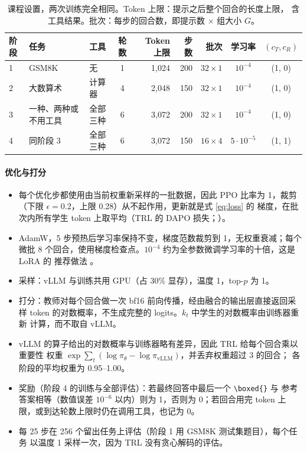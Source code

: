 \documentclass[11pt,a4paper,fontset=none]{ctexart}
\newcommand{\pis}{\pi_\theta}
\begin{document}
\begin{table}[t]
\centering\small
\caption{课程设置，两次训练完全相同。Token 上限：提示之后整个回合的长度上限，
含工具结果。批次：每步的回合数，即提示数 $\times$ 组大小 $G$。}
\label{tab:stages}
\begin{tabular}{@{}lllcrrrcc@{}}
\toprule
\headrow 阶段 & 任务 & 工具 & 轮数 & Token 上限 & 步数 & 批次 & 学习率
  & $(c_T, c_R)$ \\
\midrule
1 & GSM8K & 无 & 1 & 1{,}024 & 200 & $32\times1$ & $10^{-4}$ & (1, 0) \\
2 & 大数算术 & 计算器 & 4 & 2{,}048 & 150 & $32\times1$
  & $10^{-4}$ & (1, 0) \\
3 & 一种、两种或不用工具 & 全部三种 & 6 & 3{,}072 & 200 & $32\times1$
  & $10^{-4}$ & (1, 0) \\
4 & 同阶段 3 & 全部三种 & 6 & 3{,}072 & 150 & $16\times4$
  & $5\cdot10^{-5}$ & (1, 1) \\
\bottomrule
\end{tabular}
\end{table}

\paragraph{优化与打分}
\begin{itemize}[leftmargin=*,itemsep=1pt,topsep=2pt]
\item 每个优化步都使用由当前权重新采样的一批数据，因此 PPO 比率为 1，裁剪
  （下限 $\epsilon=0.2$，上限 0.28）从不起作用，更新就是式 \eqref{eq:loss} 的
  梯度，在批次内所有学生 token 上取平均（TRL 的 DAPO 损失；\citealp{yu2025dapo}）。
\item AdamW，5 步预热后学习率保持不变，梯度范数裁剪到 1，无权重衰减；每个微批
  8 个回合，使用梯度检查点。$10^{-4}$ 约为全参数微调学习率的十倍，这是 LoRA 的
  推荐做法 \citep{schulman2025lora}。
\item 采样：vLLM 与训练共用 GPU（占 30\% 显存），温度 1，top-$p$ 为 1。
\item 打分：教师对每个回合做一次 bf16 前向传播，经由融合的输出层直接返回采样
  token 的对数概率，不生成完整的 logits。$k_t$ 中学生的对数概率由训练器重新
  计算，而不取自 vLLM。
\item vLLM 的算子给出的对数概率与训练器略有差异，因此 TRL 给每个回合乘以重要性
  权重 $\exp\sum_t(\log\pis-\log\pi_{\text{vLLM}})$，并丢弃权重超过 3 的回合；
  各阶段的平均权重为 0.95--1.00。
\item 奖励（阶段 4 的训练与全部评估）：若最终回答中最后一个 \verb|\boxed{}| 与
  参考答案相等（数值误差 $10^{-6}$ 以内）则为 1，否则为 0；若回合用完 token
  上限，或到达轮数上限时仍在调用工具，也记为 0。
\item 每 25 步在 256 个留出任务上评估（阶段 1 用 GSM8K 测试集题目），每个任务
  以温度 1 采样一次，因为 TRL 没有贪心解码的评估。
\end{itemize}
\end{document}
